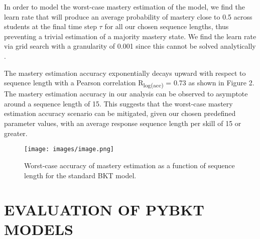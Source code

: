\documentclass{edm_article}
\begin{document}
In order to model the worst-case mastery estimation of the model, we find the learn rate that will produce an average probability of mastery close to 0.5 across students at the final time step $\tau$ for all our chosen sequence lengths, thus preventing a trivial estimation of a majority mastery state. We find the learn rate via grid search with a granularity of 0.001 since this cannot be solved analytically \cite{van2013properties}.


The mastery estimation accuracy exponentially decays upward with respect to sequence length with a Pearson correlation R\textsubscript{log(acc)} = 0.73 as shown in Figure 2. The mastery estimation accuracy in our analysis can be observed to asymptote around a sequence length of 15. This suggests that the worst-case mastery estimation accuracy scenario can be mitigated, given our chosen predefined parameter values, with an average response sequence length per skill of 15 or greater.

\begin{figure}[h!]
\caption{Worst-case accuracy of mastery estimation as a function of sequence length for the standard BKT model.}
\centering
\texttt{[image: images/image.png]}
\end{figure}

\section{EVALUATION OF PYBKT MODELS}\label{sec:Evaluation}
\end{document}
